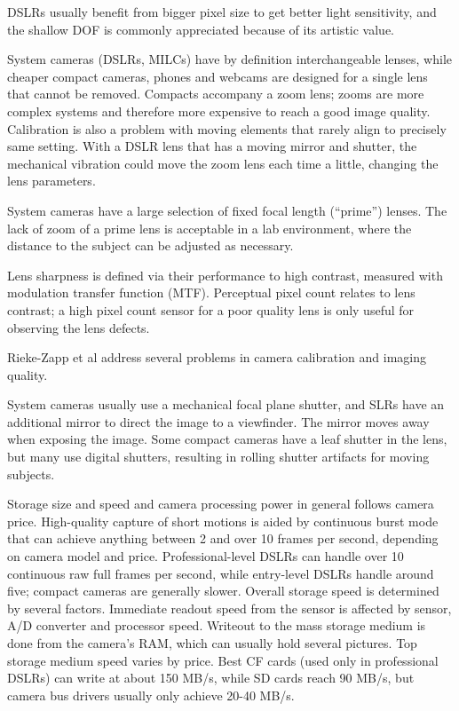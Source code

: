 DSLRs usually benefit from bigger pixel size to get better light sensitivity, and the shallow DOF is commonly appreciated because of its artistic value.



System cameras (DSLRs, MILCs) have by definition interchangeable lenses, while cheaper compact cameras, phones and webcams are designed for a single lens that cannot be removed.
Compacts accompany a zoom lens; zooms are more complex systems and therefore more expensive to reach a good image quality.
Calibration is also a problem with moving elements that rarely align to precisely same setting.
With a DSLR lens that has a moving mirror and shutter, the mechanical vibration could move the zoom lens each time a little, changing the lens parameters.

System cameras have a large selection of fixed focal length (``prime'') lenses.
The lack of zoom of a prime lens is acceptable in a lab environment, where the distance to the subject can be adjusted as necessary.

Lens sharpness is defined via their performance to high contrast, measured with modulation transfer function (MTF).
Perceptual pixel count relates to lens contrast; a high pixel count sensor for a poor quality lens is only useful for observing the lens defects.

Rieke-Zapp et al \cite{rieke2009evaluation} address several problems in camera calibration and imaging quality.


System cameras usually use a mechanical focal plane shutter, and SLRs have an additional mirror to direct the image to a viewfinder.
The mirror moves away when exposing the image.
Some compact cameras have a leaf shutter in the lens, but many use digital shutters, resulting in rolling shutter artifacts for moving subjects.

Storage size and speed and camera processing power in general follows camera price.
High-quality capture of short motions is aided by continuous burst mode that can achieve anything between 2 and over 10 frames per second, depending on camera model and price.
Professional-level DSLRs can handle over 10 continuous raw full frames per second, while entry-level DSLRs handle around five;
compact cameras are generally slower.
Overall storage speed is determined by several factors.
Immediate readout speed from the sensor is affected by sensor, A/D converter and processor speed.
Writeout to the mass storage medium is done from the camera's RAM, which can usually hold several pictures.
Top storage medium speed varies by price.
Best CF cards (used only in professional DSLRs) can write at about 150 MB/s, while SD cards reach 90 MB/s, but camera bus drivers usually only achieve 20-40 MB/s. %

